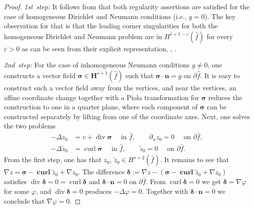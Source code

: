 \documentclass{article}
\begin{document}
\begin{proof}
\emph{1st~step:} It follows from \cite{Grisvard85,dauge88,rojikdiss} that both regularity assertions
are satisfied for the case of homogeneous Dirichlet and Neumann conditions (i.e., $g = 0$). 
The key observation for that is that the leading corner singularities for both the homogeneous
Dirichlet and Neumann problem are in $H^{\widehat{s}+1-\varepsilon}(\widehat f)$ for every $\varepsilon > 0$ 
as can be seen from their explicit representation, \cite[Sec.~4, 5]{Grisvard85}, 
\cite[p.~{82}]{grisvard92}.

\emph{2nd~step:} For the case of inhomogeneous Neumann conditions $g \ne 0$, 
one constructs a vector field ${\boldsymbol \sigma} \in {\mathbf H}^{s+1}(\widehat f)$ such that 
${\boldsymbol \sigma} \cdot {\mathbf n} = g$ on $\partial \widehat f$. It is easy to construct such a vector field
away from the vertices, and near the vertices, an affine coordinate change together with a Piola transformation
for ${\boldsymbol \sigma}$
reduces the construction to one in a 
quarter plane, where each component of ${\boldsymbol \sigma}$ can be constructed separately by lifting from 
one of the coordinate axes. Next, one solves the two problems 
\begin{align*}
-\Delta z_0 &= v + \operatorname{div} {\boldsymbol \sigma} \quad \mbox{ in $\widehat f$}, 
\qquad \partial_n z_0 = 0 \quad \mbox{ on $\partial \widehat f$}, \\
-\Delta \widetilde z_0 &= \operatorname{curl } {\boldsymbol \sigma} \quad \mbox{ in $\widehat f$}, 
\qquad \widetilde z_0 = 0 \quad \mbox{ on $\partial \widehat f$}. 
\end{align*} 
From the first step, one has that $z_0$, $\widetilde z_0 \in H^{s+2}(\widehat f)$. It remains to see that 
$\nabla z = {\boldsymbol \sigma} - \operatorname*{\mathbf{curl}} \widetilde z_0 + \nabla z_0$. The 
difference ${\boldsymbol \delta}:= \nabla z - 
({\boldsymbol \sigma} - \operatorname*{\mathbf{curl}} \widetilde z_0 + \nabla z_0)$ satisfies 
$\operatorname{div} {\boldsymbol \delta}  = 0 = \operatorname{curl} {\boldsymbol \delta}$ and 
${\boldsymbol \delta} \cdot {\mathbf n} = 0 $ on $\partial \widehat f$. 
From $\operatorname{curl}{\boldsymbol \delta} = 0$ we get 
${\boldsymbol \delta}= \nabla \varphi$ for some $\varphi$, and 
$\operatorname{div} {\boldsymbol \delta}= 0$ produces $-\Delta \varphi = 0$. 
Together with 
${\boldsymbol \delta} \cdot {\mathbf n} = 0 $ we conclude that 
$\nabla \varphi = 0$.
\end{proof}
\end{document}
